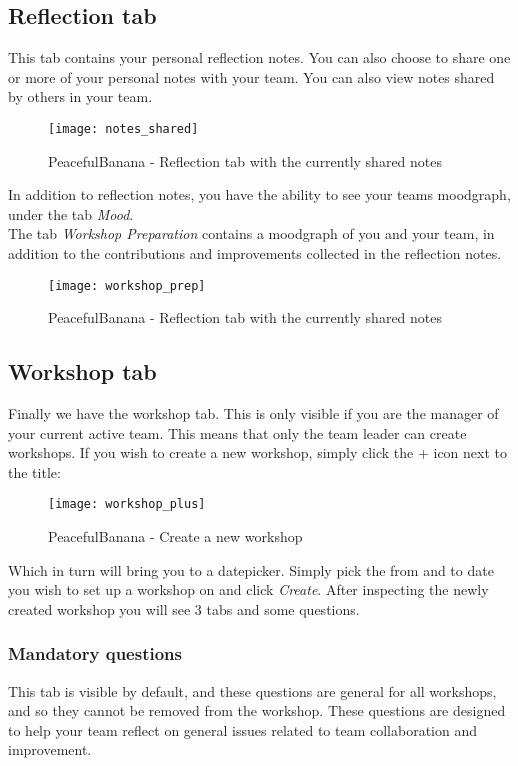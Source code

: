 \subsection{Reflection tab}
This tab contains your personal reflection notes. You can also choose to share one or more of your personal notes with your team. You can also view notes shared by others in your team. \\
\begin{figure}[h!]
\label{milestonessingular}
\centering
	\texttt{[image: notes\_shared]}
\caption{PeacefulBanana - Reflection tab with the currently shared notes}
\end{figure}
In addition to reflection notes, you have the ability to see your teams moodgraph, under the tab \textit{Mood}. \\
The tab \textit{Workshop Preparation} contains a moodgraph of you and your team, in addition to the contributions and improvements collected in the reflection notes. \\
\begin{figure}[h!]
\label{milestonessingular}
\centering
	\texttt{[image: workshop\_prep]}
\caption{PeacefulBanana - Reflection tab with the currently shared notes}
\end{figure}

%
%

\subsection{Workshop tab}
Finally we have the workshop tab. This is only visible if you are the manager of your current active team. This means that only the team leader can create workshops. 
If you wish to create a new workshop, simply click the + icon next to the title: 
\begin{figure}[h!]
\label{workshop_plus}
\centering
	\texttt{[image: workshop\_plus]}
\caption{PeacefulBanana - Create a new workshop}
\end{figure}

Which in turn will bring you to a datepicker. Simply pick the from and to date you wish to set up a workshop on and click \textit{Create}.
After inspecting the newly created workshop you will see 3 tabs and some questions. 
\subsubsection*{Mandatory questions}
This tab is visible by default, and these questions are general for all workshops, and so they cannot be removed from the workshop. These questions are designed to help your team reflect on general issues related to team collaboration and improvement. \\
